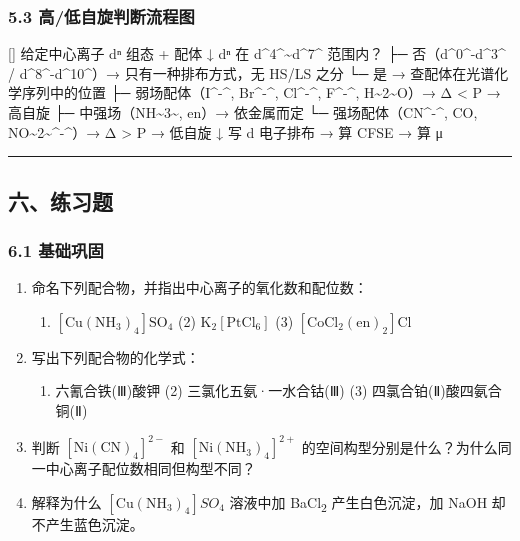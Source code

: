 \documentclass[a4paper,11pt]{ctexart}
\providecommand{\tightlist}{\setlength{\itemsep}{0pt}\setlength{\parskip}{0pt}}
\newenvironment{Shaded}{}{}
\newenvironment{Highlighting}{}{}
\newcommand{\NormalTok}[1]{#1}
\begin{document}
\subsubsection{5.3 高/低自旋判断流程图}\label{ux9ad8ux4f4eux81eaux65cbux5224ux65adux6d41ux7a0bux56fe}

\begin{Shaded}
\begin{Highlighting}[]
\NormalTok{给定中心离子 dⁿ 组态 + 配体}
\NormalTok{    ↓}
\NormalTok{dⁿ 在 d\^{}4\^{}\textasciitilde{}d\^{}7\^{} 范围内？}
\NormalTok{├─ 否（d\^{}0\^{}{-}d\^{}3\^{} / d\^{}8\^{}{-}d\^{}10\^{}）→ 只有一种排布方式，无 HS/LS 之分}
\NormalTok{└─ 是 → 查配体在光谱化学序列中的位置}
\NormalTok{    ├─ 弱场配体（I\^{}{-}\^{}, Br\^{}{-}\^{}, Cl\^{}{-}\^{}, F\^{}{-}\^{}, H\textasciitilde{}2\textasciitilde{}O）→ Δ \textless{} P → 高自旋}
\NormalTok{    ├─ 中强场（NH\textasciitilde{}3\textasciitilde{}, en）→ 依金属而定}
\NormalTok{    └─ 强场配体（CN\^{}{-}\^{}, CO, NO\textasciitilde{}2\textasciitilde{}\^{}{-}\^{}）→ Δ \textgreater{} P → 低自旋}
\NormalTok{        ↓}
\NormalTok{写 d 电子排布 → 算 CFSE → 算 μ}
\end{Highlighting}
\end{Shaded}

\begin{center}\rule{0.5\linewidth}{0.5pt}\end{center}

\subsection{六、练习题}\label{ux516dux7ec3ux4e60ux9898}

\subsubsection{6.1 基础巩固}\label{ux57faux7840ux5de9ux56fa}

\begin{enumerate}
\def\labelenumi{\arabic{enumi}.}
\item
  命名下列配合物，并指出中心离子的氧化数和配位数：

  \begin{enumerate}
  \def\labelenumii{(\arabic{enumii})}
  \tightlist
  \item
    \(\mathrm{[Cu(NH_3)_4]SO_4}\) (2) \(\mathrm{K_2[PtCl_6]}\) (3) \(\mathrm{[CoCl_2(en)_2]Cl}\)
  \end{enumerate}
\item
  写出下列配合物的化学式：

  \begin{enumerate}
  \def\labelenumii{(\arabic{enumii})}
  \tightlist
  \item
    六氰合铁(Ⅲ)酸钾 (2) 三氯化五氨·一水合钴(Ⅲ) (3) 四氯合铂(Ⅱ)酸四氨合铜(Ⅱ)
  \end{enumerate}
\item
  判断 \(\mathrm{[Ni(CN)_4]^{2-}}\) 和 \(\mathrm{[Ni(NH_3)_4]^{2+}}\) 的空间构型分别是什么？为什么同一中心离子配位数相同但构型不同？
\item
  解释为什么 \([\mathrm{Cu(NH_3)_4}]SO_4\) 溶液中加 BaCl\textsubscript{2} 产生白色沉淀，加 NaOH 却不产生蓝色沉淀。
\end{enumerate}
\end{document}

